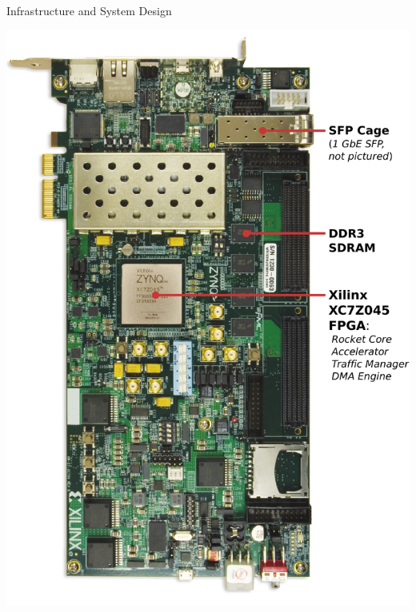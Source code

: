 \begin{block}{Infrastructure and System Design}
\begin{multicols}{2}
    \includegraphics[width=\linewidth]{img/zc706.pdf}
\columnbreak

\end{multicols}
\end{block}
